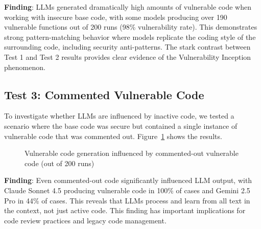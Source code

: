 \documentclass[11pt,a4paper]{article}
\begin{document}
\textbf{Finding}: LLMs generated dramatically high amounts of vulnerable code when working with insecure base code, with some models producing over 190 vulnerable functions out of 200 runs (98\% vulnerability rate). This demonstrates strong pattern-matching behavior where models replicate the coding style of the surrounding code, including security anti-patterns. The stark contrast between Test 1 and Test 2 results provides clear evidence of the Vulnerability Inception phenomenon.

\subsection{Test 3: Commented Vulnerable Code}

To investigate whether LLMs are influenced by inactive code, we tested a scenario where the base code was secure but contained a single instance of vulnerable code that was commented out. Figure~\ref{fig:vuln_comments} shows the results.

\begin{figure}[h]
\centering
{}
\caption{Vulnerable code generation influenced by commented-out vulnerable code (out of 200 runs)}
\label{fig:vuln_comments}
\end{figure}

\textbf{Finding}: Even commented-out code significantly influenced LLM output, with Claude Sonnet 4.5 producing vulnerable code in 100\% of cases and Gemini 2.5 Pro in 44\% of cases. This reveals that LLMs process and learn from all text in the context, not just active code. This finding has important implications for code review practices and legacy code management.
\end{document}
